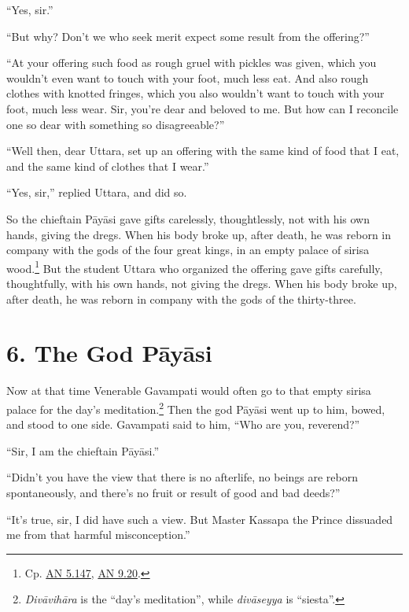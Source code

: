 \documentclass[12pt,openany]{book}%
\begin{document}
“Yes, sir.” 

“But why? Don’t we who seek merit expect some result from the offering?” 

“At your offering such food as rough gruel with pickles was given, which you wouldn’t even want to touch with your foot, much less eat. And also rough clothes with knotted fringes, which you also wouldn’t want to touch with your foot, much less wear. Sir, you’re dear and beloved to me. But how can I reconcile one so dear with something so disagreeable?” 

“Well then, dear Uttara, set up an offering with the same kind of food that I eat, and the same kind of clothes that I wear.” 

“Yes, sir,” replied Uttara, and did so. 

So the chieftain \textsanskrit{Pāyāsi} gave gifts carelessly, thoughtlessly, not with his own hands, giving the dregs. When his body broke up, after death, he was reborn in company with the gods of the four great kings, in an empty palace of sirisa wood.\footnote{Cp. \href{https://suttacentral.net/an5.147/en/sujato}{AN 5.147}, \href{https://suttacentral.net/an9.20/en/sujato}{AN 9.20}. } But the student Uttara who organized the offering gave gifts carefully, thoughtfully, with his own hands, not giving the dregs. When his body broke up, after death, he was reborn in company with the gods of the thirty-three. 

\section*{6. The God \textsanskrit{Pāyāsi} }

Now at that time Venerable Gavampati would often go to that empty sirisa palace for the day’s meditation.\footnote{\textit{\textsanskrit{Divāvihāra}} is the “day’s meditation”, while \textit{\textsanskrit{divāseyya}} is “siesta”. } Then the god \textsanskrit{Pāyāsi} went up to him, bowed, and stood to one side. Gavampati said to him, “Who are you, reverend?” 

“Sir, I am the chieftain \textsanskrit{Pāyāsi}.” 

“Didn’t you have the view that there is no afterlife, no beings are reborn spontaneously, and there’s no fruit or result of good and bad deeds?” 

“It’s true, sir, I did have such a view. But Master Kassapa the Prince dissuaded me from that harmful misconception.” 
\end{document}
